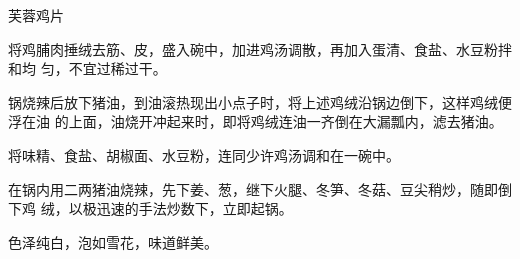 %
%
%
%
%
%
%
\begin{recipe}{芙蓉鸡片}

\ingredients


\preparation

将鸡脯肉捶绒去筋、皮，盛入碗中，加进鸡汤调散，再加入蛋清、食盐、水豆粉拌和均
匀，不宜过稀过干。

锅烧辣后放下猪油，到油滚热现出小点子时，将上述鸡绒沿锅边倒下，这样鸡绒便浮在油
的上面，油烧开冲起来时，即将鸡绒连油一齐倒在大漏瓢内，滤去猪油。

将味精、食盐、胡椒面、水豆粉，连同少许鸡汤调和在一碗中。

在锅内用二两猪油烧辣，先下姜、葱，继下火腿、冬笋、冬菇、豆尖稍炒，随即倒下鸡
绒，以极迅速的手法炒数下，立即起锅。

\features

色泽纯白，泡如雪花，味道鲜美。

\end{recipe}

